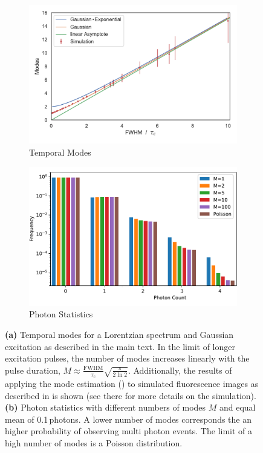 \begin{figure}
	\centering
	\begin{subfigure}[b]{0.49\textwidth}
		\centering
		\includegraphics[width=\linewidth]{images/temporalmodes.pdf}
		\caption{Temporal Modes}
		\label{fig:theorymodes}
	\end{subfigure}
	\begin{subfigure}[b]{0.49\textwidth}
		\centering
    	\includegraphics[width=\linewidth]{images/modes_stat.pdf}
		\caption{Photon Statistics}
		\label{fig:stat}	
		\end{subfigure}
	\caption[Temporal Modes and Photons statistics]{\textbf{(a)} Temporal modes for a Lorentzian spectrum and Gaussian excitation as described in the main text. In the limit of longer excitation pulses, the number of modes increases linearly with the pulse duration, $M\approx \frac{\text{FWHM}}{\tau_c} \sqrt{\frac{\pi} {2 \ln{2}}}$.  Additionally, the results of applying the mode estimation   () to simulated fluorescence images as described in  is shown (see there for more details on the simulation). \textbf{(b)} Photon statistics with different numbers of modes $M$ and equal mean of 0.1\,photons. A lower number of modes corresponds the an higher probability of observing multi photon events. The limit of a high number of modes is a Poisson distribution.}
\end{figure}

